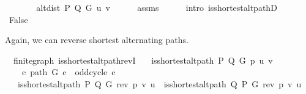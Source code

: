 \begin{isabellebody}
\ \ \isamarkupfalse%
\ \isamarkupfalse%
\ {\isachardoublequoteopen}{\isachardot}{\kern0pt}{\isachardot}{\kern0pt}{\isachardot}{\kern0pt}\ {\isacharequal}{\kern0pt}\ alt{\isacharunderscore}{\kern0pt}dist\ P\ Q\ G\ u\ v{\isachardoublequoteclose}\isanewline
\ \ \ \ \isamarkupfalse%
\ assms{\isacharparenleft}{\kern0pt}{}{\isacharparenright}{\kern0pt}\isanewline
\ \ \ \ \isamarkupfalse%
\ {\isacharparenleft}{\kern0pt}intro\ is{\isacharunderscore}{\kern0pt}shortest{\isacharunderscore}{\kern0pt}alt{\isacharunderscore}{\kern0pt}pathD{\isacharparenleft}{\kern0pt}{}{\isacharparenright}{\kern0pt}{\isacharparenright}{\kern0pt}\isanewline
\ \ \isamarkupfalse%
\ \isamarkupfalse%
\ False\isanewline
\ \ \ \ \isacommand{{\isachardot}{\kern0pt}{\isachardot}{\kern0pt}}\isamarkupfalse%
\isanewline
{}\isamarkupfalse%
%
\endisatagproof
{\isafoldproof}%
%
\isadelimproof
%
\endisadelimproof
%
\begin{isamarkuptext}%
Again, we can reverse shortest alternating paths.%
\end{isamarkuptext}\isamarkuptrue%
\isamarkupfalse%
\ {\isacharparenleft}{\kern0pt}\ finite{\isacharunderscore}{\kern0pt}graph{\isacharparenright}{\kern0pt}\ is{\isacharunderscore}{\kern0pt}shortest{\isacharunderscore}{\kern0pt}alt{\isacharunderscore}{\kern0pt}path{\isacharunderscore}{\kern0pt}revI{\isacharcolon}{\kern0pt}\isanewline
\ \ \ {\isachardoublequoteopen}is{\isacharunderscore}{\kern0pt}shortest{\isacharunderscore}{\kern0pt}alt{\isacharunderscore}{\kern0pt}path\ P\ Q\ G\ p\ u\ v{\isachardoublequoteclose}\isanewline
\ \ \ {\isachardoublequoteopen}{\isasymnot}\ {\isacharparenleft}{\kern0pt}{\isasymexists}c{\isachardot}{\kern0pt}\ path\ G\ c\ {\isasymand}\ odd{\isacharunderscore}{\kern0pt}cycle\ c{\isacharparenright}{\kern0pt}{\isachardoublequoteclose}\isanewline
\ \ \ {\isachardoublequoteopen}is{\isacharunderscore}{\kern0pt}shortest{\isacharunderscore}{\kern0pt}alt{\isacharunderscore}{\kern0pt}path\ P\ Q\ G\ {\isacharparenleft}{\kern0pt}rev\ p{\isacharparenright}{\kern0pt}\ v\ u\ {\isasymor}\ is{\isacharunderscore}{\kern0pt}shortest{\isacharunderscore}{\kern0pt}alt{\isacharunderscore}{\kern0pt}path\ Q\ P\ G\ {\isacharparenleft}{\kern0pt}rev\ p{\isacharparenright}{\kern0pt}\ v\ u{\isachardoublequoteclose}\isanewline
%
\isadelimproof
\ \ %
\endisadelimproof
%
\isatagproof
{}\isamarkupfalse%

\end{isabellebody}
